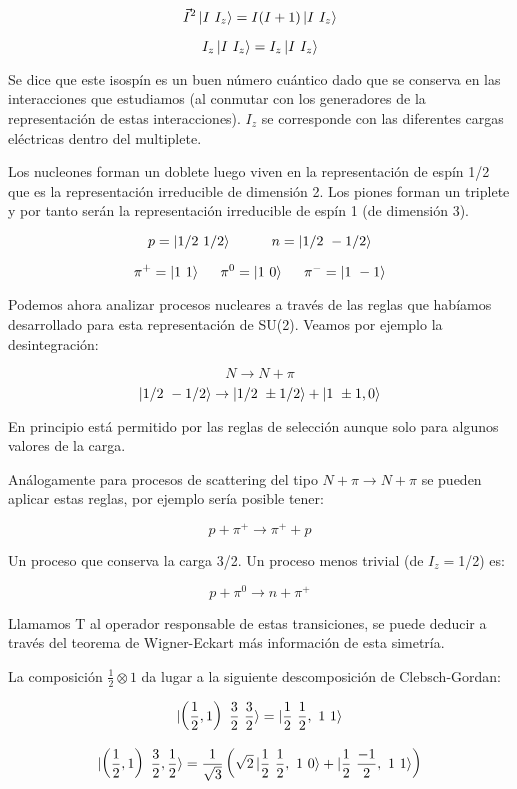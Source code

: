 \documentclass{article}
\begin{document}
$$\Vec{I}^2 \ket{I \ I_z} = I(I+1)\ket{I \ I_z}$$

$$I_z \ket{I \ I_z} = I_z \ket{I \ I_z}$$

Se dice que este isospín es un buen número cuántico dado que se conserva en las interacciones que estudiamos (al conmutar con los generadores de la representación de estas interacciones). $I_z$ se corresponde con las diferentes cargas eléctricas dentro del multiplete.

\smallskip
Los nucleones forman un doblete luego viven en la representación de espín 1/2 que es la representación irreducible de dimensión 2. Los piones forman un triplete y por tanto serán la representación irreducible de espín 1 (de dimensión 3).

$$p=\ket{1/2 \ 1/2} \hspace{1cm} n=\ket{1/2 \ -1/2}$$

$$\pi^+ = \ket{1 \ 1} \hspace{0.5cm} \pi^0 = \ket{1 \ 0} \hspace{0.5cm} \pi^- = \ket{1 \ -1} $$

Podemos ahora analizar procesos nucleares a través de las reglas que habíamos desarrollado para esta representación de SU(2). Veamos por ejemplo la desintegración:

$$N \to N + \pi$$
$$\ket{1/2 \ -1/2} \to \ket{1/2 \ \pm 1/2} + \ket{1 \ \pm 1,0}$$

En principio está permitido por las reglas de selección aunque solo para algunos valores de la carga.

\smallskip
Análogamente para procesos de scattering del tipo $N+\pi \to N + \pi$ se pueden aplicar estas reglas, por ejemplo sería posible tener:

$$p + \pi ^+ \to \pi ^+ + p$$

Un proceso que conserva la carga 3/2. Un proceso menos trivial (de $I_z=$1/2) es:

$$p + \pi ^0 \to n + \pi ^+$$

Llamamos T al operador responsable de estas transiciones, se puede deducir a través del teorema de Wigner-Eckart más información de esta simetría.

\smallskip
La composición $\frac{1}{2}\otimes 1$ da lugar a la siguiente descomposición de Clebsch-Gordan:

$$\ket{\left ( \frac{1}{2},1\right) \ \frac{3}{2} \ \frac{3}{2}}=\ket{\frac{1}{2} \ \frac{1}{2} , \ 1 \ 1}$$

$$\ket{\left ( \frac{1}{2},1\right) \ \frac{3}{2}, \frac{1}{2}}= \frac{1}{\sqrt{3}}\left ( \sqrt{2} \ket{\frac{1}{2} \ \frac{1}{2}, \ 1 \ 0 } + \ket{\frac{1}{2} \ \frac{-1}{2} , \ 1 \ 1}\right)$$
\end{document}
